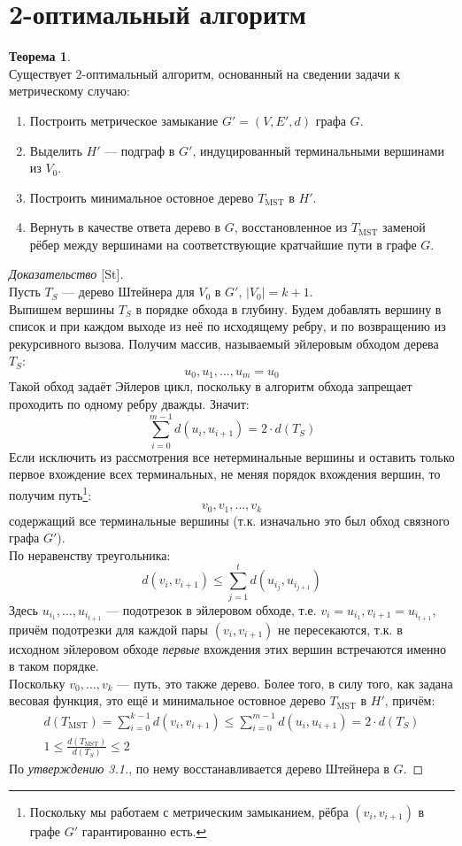 \documentclass[11pt,a4paper]{report}
\def\le{\leqslant}
\theoremstyle{definition}
\theoremstyle{definition}
\newtheorem{theorem}{Теорема}[section]
\theoremstyle{definition}
\begin{document}
	\section{2-оптимальный алгоритм}
	\begin{theorem}$  $\\
		Существует 2-оптимальный алгоритм, основанный на сведении задачи к метрическому случаю:
		\begin{enumerate}
			\item Построить метрическое замыкание $G' = (V, E', d)$ графа $G$.
			\item Выделить $H'$ — подграф в $G'$, индуцированный терминальными вершинами из $V_0$. 
			\item Построить минимальное остовное дерево $T_{\mathrm{MST}}$ в $H'$.
			\item Вернуть в качестве ответа дерево в $G$, восстановленное из $T_{\mathrm{MST}} $ заменой рёбер между вершинами на соответствующие кратчайшие пути в графе $G$.
		\end{enumerate}
	\end{theorem}
	\begin{proof}[Доказательство $ \text{[St]} $]$  $\\
		Пусть $T_{S}$ — дерево Штейнера для $V_0$ в $G'$, $ |V_0| = k+1 $.\\
		Выпишем вершины $T_{S}$ в порядке обхода в глубину. Будем добавлять вершину в список и при каждом выходе из неё по исходящему ребру, и по возвращению из рекурсивного вызова. Получим массив, называемый эйлеровым обходом дерева $T_{S}$:
		$$
			u_0, u_1, \ldots, u_m = u_0
		$$ 
		Такой обход задаёт Эйлеров цикл, поскольку в алгоритм обхода запрещает проходить по одному ребру дважды. Значит:
		$$ 
			\sum_{i=0}^{m-1} d(u_i, u_{i+1}) = 2 \cdot d(T_{S})
		$$
		Если исключить из рассмотрения все нетерминальные вершины и оставить только первое вхождение всех терминальных, не меняя порядок вхождения вершин, то получим путь\footnote{Поскольку мы работаем с метрическим замыканием, рёбра $(v_{i}, v_{i+1})$ в графе $G'$ гарантированно есть.}:
		$$
			v_0, v_1, \ldots, v_k
		$$
		содержащий все терминальные вершины (т.к. изначально это был обход связного графа $G'$).\\ 
		По неравенству треугольника:
		$$
			d(v_i, v_{i+1}) \le \sum_{j=1}^{t} d(u_{i_j}, u_{i_{j+1}})
		$$
		Здесь $ u_{i_{1}},\ldots, u_{i_{t+1}} $ — подотрезок в эйлеровом обходе, т.е. $v_i = u_{i_{1}}, v_{i+1} = u_{i_{t+1}}$, причём подотрезки для каждой пары $ (v_{i}, v_{i+1}) $ не пересекаются, т.к. в исходном эйлеровом обходе \textit{первые} вхождения этих вершин встречаются именно в таком порядке.\\
		Поскольку $v_0, \ldots, v_k$ — путь, это также дерево. Более того, в силу того, как задана весовая функция, это ещё и минимальное остовное дерево $T_{\mathrm{MST}}$ в $H'$, причём:
		\begin{gather*}
			d(T_{\mathrm{MST}}) = \sum_{i=0}^{k-1} d(v_{i}, v_{i+1}) \le \sum_{i=0}^{m-1} d(u_i, u_{i+1}) = 2 \cdot d(T_{S})\\
			1 \le \frac{d(T_{\mathrm{MST}})}{d(T_{S})} \le 2
		\end{gather*}
		По \textit{утверждению 3.1.}, по нему восстанавливается дерево Штейнера в $G$.
	\end{proof}
\end{document}
